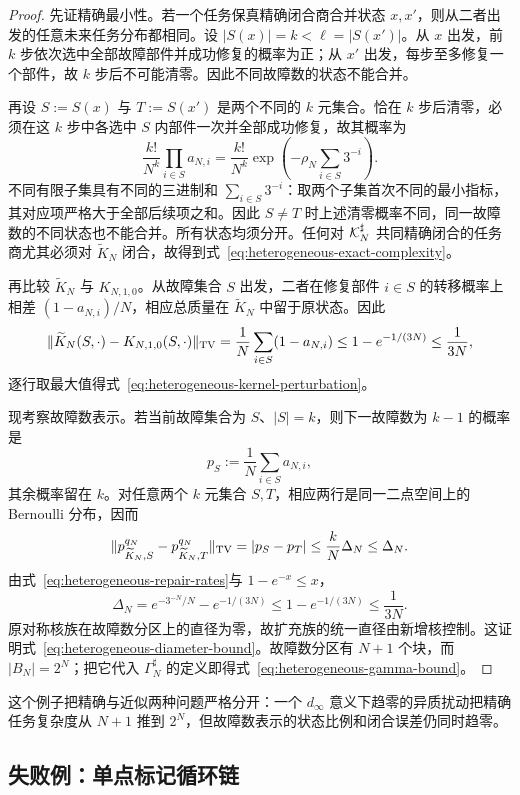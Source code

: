 \begin{proof}
先证精确最小性。若一个任务保真精确闭合商合并状态 $x,x'$，则从二者出发的任意未来任务分布都相同。设 $|S(x)|=k<\ell=|S(x')|$。从 $x$ 出发，前 $k$ 步依次选中全部故障部件并成功修复的概率为正；从 $x'$ 出发，每步至多修复一个部件，故 $k$ 步后不可能清零。因此不同故障数的状态不能合并。

再设 $S:=S(x)$ 与 $T:=S(x')$ 是两个不同的 $k$ 元集合。恰在 $k$ 步后清零，必须在这 $k$ 步中各选中 $S$ 内部件一次并全部成功修复，故其概率为
\[
 \frac{k!}{N^k}\prod_{i\in S}a_{N,i}
 =\frac{k!}{N^k}
   \exp\!\left(-\rho_N\sum_{i\in S}3^{-i}\right).
\]
不同有限子集具有不同的三进制和 $\sum_{i\in S}3^{-i}$：取两个子集首次不同的最小指标，其对应项严格大于全部后续项之和。因此 $S\ne T$ 时上述清零概率不同，同一故障数的不同状态也不能合并。所有状态均须分开。任何对 $\mathcal K_N^\sharp$ 共同精确闭合的任务商尤其必须对 $\widetilde K_N$ 闭合，故得到式~\eqref{eq:heterogeneous-exact-complexity}。

再比较 $\widetilde K_N$ 与 $K_{N,1,0}$。从故障集合 $S$ 出发，二者在修复部件 $i\in S$ 的转移概率上相差 $(1-a_{N,i})/N$，相应总质量在 $\widetilde K_N$ 中留于原状态。因此
\[
 \|\widetilde K_N(S,\cdot)-K_{N,1,0}(S,\cdot)\|_{\operatorname{TV}}
 =\frac1N\sum_{i\in S}(1-a_{N,i})
 \le 1-e^{-1/(3N)}
 \le\frac1{3N},
\]
逐行取最大值得式~\eqref{eq:heterogeneous-kernel-perturbation}。

现考察故障数表示。若当前故障集合为 $S$、$|S|=k$，则下一故障数为 $k-1$ 的概率是
\[
 p_S:=\frac1N\sum_{i\in S}a_{N,i},
\]
其余概率留在 $k$。对任意两个 $k$ 元集合 $S,T$，相应两行是同一二点空间上的 Bernoulli 分布，因而
\[
 \|p^{q_N}_{\widetilde K_N,S}-p^{q_N}_{\widetilde K_N,T}\|_{\operatorname{TV}}
 =|p_S-p_T|
 \le\frac{k}{N}\Delta_N
 \le\Delta_N.
\]
由式~\eqref{eq:heterogeneous-repair-rates}与 $1-e^{-x}\le x$，
\[
 \Delta_N
 =e^{-3^{-N}/N}-e^{-1/(3N)}
 \le1-e^{-1/(3N)}
 \le\frac1{3N}.
\]
原对称核族在故障数分区上的直径为零，故扩充族的统一直径由新增核控制。这证明式~\eqref{eq:heterogeneous-diameter-bound}。故障数分区有 $N+1$ 个块，而 $|B_N|=2^N$；把它代入 $\Gamma_N^\sharp$ 的定义即得式~\eqref{eq:heterogeneous-gamma-bound}。
\end{proof}

这个例子把精确与近似两种问题严格分开：一个 $d_\infty$ 意义下趋零的异质扰动把精确任务复杂度从 $N+1$ 推到 $2^N$，但故障数表示的状态比例和闭合误差仍同时趋零。

\subsection{失败例：单点标记循环链}

